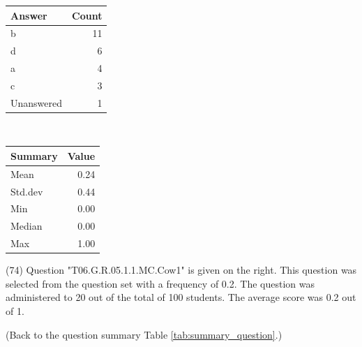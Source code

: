 \documentclass[12pt,nohyper]{tufte-handout}\usepackage[]{graphicx}\usepackage[]{color}
\begin{document}
\begin{center}%
\begin{tabular}{lr}
  \hline
Answer & Count \\ 
  \hline
b &  11 \\ 
  d &   6 \\ 
  a &   4 \\ 
  c &   3 \\ 
  Unanswered &   1 \\ 
   \hline
\end{tabular}
~~~~~~~~%
\begin{tabular}{lr}
  \hline
Summary & Value \\ 
  \hline
Mean & 0.24 \\ 
  Std.dev & 0.44 \\ 
  Min & 0.00 \\ 
  Median & 0.00 \\ 
  Max & 1.00 \\ 
   \hline
\end{tabular}
\end{center}\newpage{} (74) Question "T06.G.R.05.1.1.MC.Cow1" is given on the right. This question was selected from the question set with a frequency of 0.2. The question was administered to 20 out of the total of 100 students. The average score was 0.2 out of 1.

 (Back to the question summary Table \ref{tab:summary_question}.)
\end{document}
